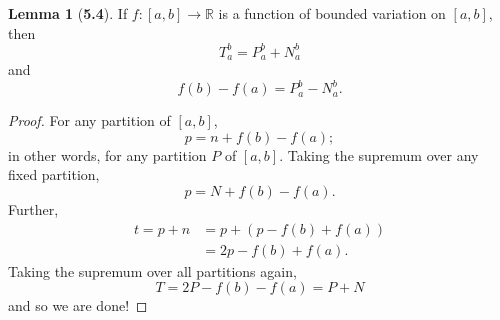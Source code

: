 \documentclass[12pt]{article}
\newcommand{\R}{\mathbb{R}}
\theoremstyle{definition}
\newtheorem*{lemma}{Lemma}
\begin{document}
\begin{lemma}[\textbf{5.4}]

    If \( f:[a,b] \to \R \) is a function of bounded variation on \( [a,b]\), then
        \[
            T_{a}^{b} = P_{a}^{b} + N_{a}^{b}  
        \]
    and 
        \[
            f(b) - f(a) =   P_{a}^{b} - N_{a}^{b}.
        \]
        
        \begin{proof}
            For any partition of \( [a,b] \),
                \[
                    p = n + f(b) - f(a);
                \]
            in other words, for any partition \( P \) of \( [a,b] \). Taking the supremum over any fixed partition,
                \[  
                     p = N + f(b) - f(a).
                \]
            Further,
                \begin{align*}
                    t = p + n &= p + (p - f(b) + f(a))  \\
                    &= 2p - f(b) + f(a).
                \end{align*}
            Taking the supremum over all partitions again,
                \[
                    T = 2P - f(b) - f(a) = P + N  
                \]
            and so we are done!
        \end{proof}

\end{lemma}
\end{document}
